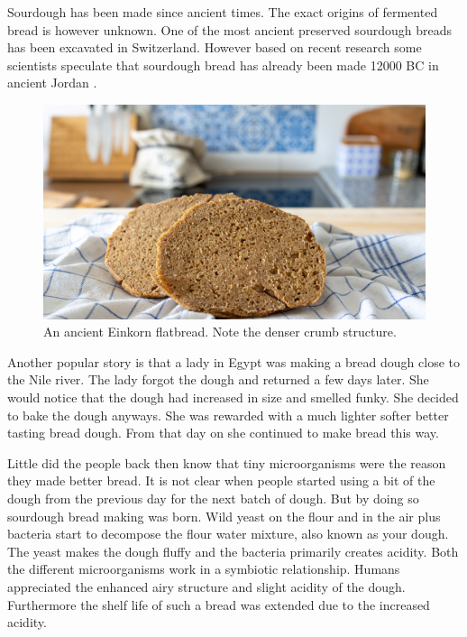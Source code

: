 Sourdough has been made since ancient times. The exact origins
of fermented bread is however unknown. One of the most ancient
preserved sourdough breads has been excavated in Switzerland.
However based on recent research some scientists speculate
that sourdough bread has already been made 12000 BC in ancient
Jordan \cite{jordan+bread}.

\begin{figure}[h]
  \includegraphics[width=\textwidth]{einkorn-crumb}
  \caption{An ancient Einkorn flatbread. Note the denser crumb structure.}
  \label{einkorn-crumb}
\end{figure}

Another popular story is that a lady in Egypt was making
a bread dough close to the Nile river. The lady forgot the
dough and returned a few days later. She would notice that
the dough had increased in size and smelled funky. She decided
to bake the dough anyways. She was rewarded with a much
lighter softer better tasting bread dough. From that day
on she continued to make bread this way.

Little did the people back then know that tiny microorganisms
were the reason they made better bread. It is not clear when
people started using a bit of the dough from the previous
day for the next batch of dough. But by doing so sourdough
bread making was born. Wild yeast on the flour and in the air
plus bacteria start to decompose the flour water mixture, also
known as your dough. The yeast makes the dough fluffy and
the bacteria primarily creates acidity. Both the different
microorganisms work in a symbiotic relationship. Humans
appreciated the enhanced airy structure and slight acidity
of the dough. Furthermore the shelf life of such a bread
was extended due to the increased acidity. 

